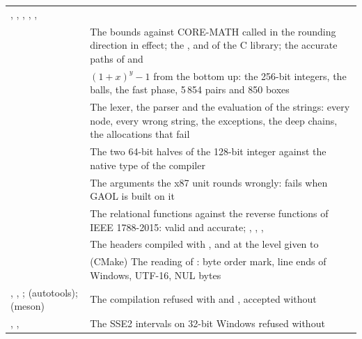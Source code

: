 \documentclass[12pt,a4paper,twoside,openright]{book}
\begin{document}
\begin{longtable}{L{4.4cm}L{9.4cm}}
    , , , ,
    , \\
   & The bounds against CORE-MATH called in the rounding
    direction in effect; the ,  and
     of the C library; the accurate paths of  and
    \\
   & $(1+x)^y-1$ from the bottom up: the 256-bit integers,
    the balls, the fast phase, 5\,854 pairs and 850 boxes\\
   & The lexer, the parser and the evaluation of the
    strings: every node, every wrong string, the exceptions, the deep
    chains, the allocations that fail\\
   & The two 64-bit halves of the 128-bit integer against the
    native type of the compiler\\
   & The arguments the x87 unit rounds wrongly:
    fails when GAOL is built on it\\
   & The relational functions against the reverse functions
    of IEEE 1788-2015: valid and accurate; ,
    , , \\
   & The headers compiled with , and
     at the level given to \\
   & (CMake) The reading of : byte
    order mark, line ends of Windows, UTF-16, NUL bytes\\
  ,\newline
    ,\newline
    ;\newline
     (autotools);\newline
     (meson) & The compilation refused with
     and , accepted
    without\\
  ,\newline
    ,\newline
     & The SSE2 intervals on
32-bit
    Windows refused without \\

\end{longtable}
\end{document}
